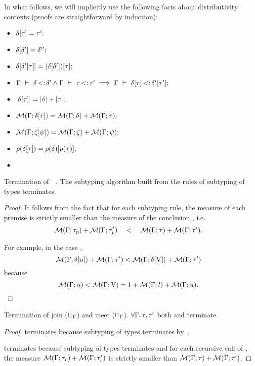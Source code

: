 In what follows, we will implicitly use the following facts about
distributivity contexts (proofs are straightforward by induction):
\begin{itemize}
    \item $\delta[\tau] = \tau';$
    \item $\delta[\delta'] = \delta'';$
    \item $\delta[\delta'[\tau]] = 
        (\delta[\delta'])[\tau];$
    \item $\Gamma\ \vdash\ \delta \operatorname{<:} \delta' \land \Gamma\ \vdash\ \tau \operatorname{<:} \tau'
        \implies \Gamma\ \vdash\ \delta[\tau] \operatorname{<:} \delta'[\tau'];$
    \item $|\delta[\tau]| = |\delta| + |\tau|;$
    \item $\operatorname{\mathcal{M}}(\Gamma;\delta[\tau]) = \operatorname{\mathcal{M}}(\Gamma;\delta) + \operatorname{\mathcal{M}}(\Gamma;\tau);$
    \item $\operatorname{\mathcal{M}}(\Gamma;\zeta[\psi]) = 
        \operatorname{\mathcal{M}}(\Gamma;\zeta) + \operatorname{\mathcal{M}}(\Gamma;\psi);$
    \item $\rho(\delta[\tau]) = 
        \rho(\delta)[\rho(\tau)]; $    
    \item {}
\end{itemize}


\begin{theorem}{Termination of\ \ .}%
\label{thm:subty-terminates}
    The subtyping algorithm built from the rules of subtyping of types
     terminates.
\end{theorem}
\begin{proof}
    It follows from the fact that for each subtyping rule, 
    the measure of each premise 
    is strictly smaller than the measure 
    of the conclusion , i.e.
    \[\operatorname{\mathcal{M}}(\Gamma;\tau_p) + \operatorname{\mathcal{M}}(\Gamma;\tau'_p) \quad<\quad 
    \operatorname{\mathcal{M}}(\Gamma;\tau) + \operatorname{\mathcal{M}}(\Gamma;\tau').\]

    For example, in the case ,
    \[\operatorname{\mathcal{M}}(\Gamma;\delta[u]) + \operatorname{\mathcal{M}}(\Gamma;\tau') < 
    \operatorname{\mathcal{M}}(\Gamma;\delta[\mathrm{V}]) + \operatorname{\mathcal{M}}(\Gamma;\tau')\]
    because \[\operatorname{\mathcal{M}}(\Gamma;u) < \operatorname{\mathcal{M}}(\Gamma;\mathrm{V}) = 
        1 + \operatorname{\mathcal{M}}(\Gamma;l) + \operatorname{\mathcal{M}}(\Gamma;u).\]
\end{proof}


\begin{lemma}{Termination of join ($\sqcup_{\Gamma}$) and meet ($\sqcap_{\Gamma}$).}%
\label{lem:meet-terminates}
    $\forall \Gamma, \tau, \tau'$ both
     and  terminate.
\end{lemma}
\begin{proof}
     terminates because subtyping of types terminates
    by~.

     terminates because subtyping of types terminates
    and for each recursive call  of 
    , the measure $\operatorname{\mathcal{M}}(\Gamma;\tau_r) + \operatorname{\mathcal{M}}(\Gamma;\tau'_r)$ 
    is strictly smaller than $\operatorname{\mathcal{M}}(\Gamma;\tau) + \operatorname{\mathcal{M}}(\Gamma;\tau')$.
\end{proof}

